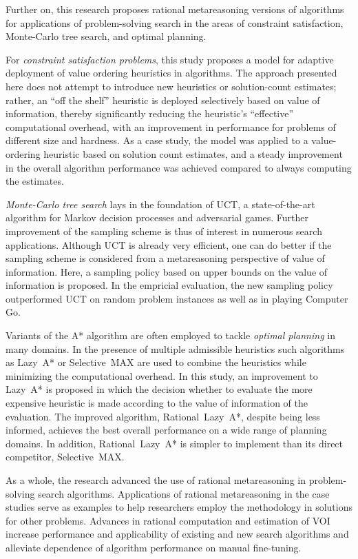Further on, this research proposes rational metareasoning versions of
algorithms for applications of problem-solving search in the areas of
constraint satisfaction, Monte-Carlo tree search, and optimal
planning. 

For \emph{constraint satisfaction problems}, this study proposes a model for
adaptive deployment of value ordering heuristics in algorithms. The
approach presented here does not attempt to introduce new
heuristics or solution-count estimates; rather, an ``off the shelf''
heuristic is deployed selectively based on value of information,
thereby significantly reducing the heuristic's ``effective''
computational overhead, with an improvement in performance for
problems of different size and hardness. As a case study, the model
was applied to a value-ordering heuristic based on solution count
estimates, and a steady improvement in the overall algorithm
performance was achieved compared to always computing the
estimates.

\emph{Monte-Carlo tree search} lays in the foundation of UCT, a
state-of-the-art algorithm for Markov decision processes and
adversarial games. Further improvement of the sampling scheme is thus
of interest in numerous search applications. Although UCT is already
very efficient, one can do better if the sampling scheme is considered
from a metareasoning perspective of value of information. Here, a
sampling policy based on upper bounds on the value of information is
proposed. In the empricial evaluation, the new sampling policy 
outperformed UCT on random problem instances as well as in playing
Computer Go. 

Variants of the A* algorithm are often employed to tackle 
\emph{optimal planning} in many domains. In the presence of multiple
admissible heuristics such algorithms as Lazy~A* or Selective~MAX
are used to combine the heuristics while minimizing the computational
overhead. In this study, an improvement to Lazy~A* is proposed in
which the decision whether to evaluate the more expensive heuristic is
made according to the value of information of the evaluation. The
improved algorithm, Rational~Lazy~A*, despite being less informed,
achieves the best overall performance on a wide range of planning
domains. In addition,  Rational~Lazy~A* is simpler to implement than
its direct competitor, Selective~MAX.

As a whole, the research advanced the use of rational
metareasoning in problem-solving search algorithms. Applications of
rational metareasoning in the case studies serve as examples
to help researchers employ the methodology in solutions for other
problems. Advances in rational computation and estimation of VOI increase
performance and applicability of existing and new search algorithms
and alleviate dependence of algorithm performance on manual
fine-tuning.

